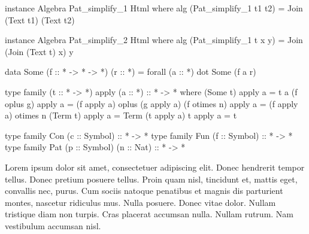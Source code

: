 \begin{code}
instance Algebra Pat_simplify_1 Html where
  alg (Pat_simplify_1 t1 t2) = Join (Text t1) (Text t2)

instance Algebra Pat_simplify_2 Html where
  alg (Pat_simplify_1 t x y) = Join (Join (Text t) x) y
\end{code}


\begin{code}
data Some (f :: * -> * -> *) (r :: *) = forall (a :: *) dot Some (f a r)
\end{code}

\begin{code}
type family (t :: * -> *) apply (a :: *) :: * -> *  where
  (Some t)      apply  a  = t a
  (f oplus g)   apply  a  = (f apply a) oplus (g apply a)
  (f otimes n)  apply  a  = (f apply a) otimes n
  (Term t)      apply  a  = Term (t apply a)
  t             apply  a  = t
\end{code}

\begin{code}
type family Con (c :: Symbol)             :: * -> *
type family Fun (f :: Symbol)             :: * -> *
type family Pat (p :: Symbol) (n :: Nat)  :: * -> *
\end{code}

Lorem ipsum dolor sit amet, consectetuer adipiscing elit. Donec hendrerit tempor
tellus. Donec pretium posuere tellus. Proin quam nisl, tincidunt et, mattis
eget, convallis nec, purus. Cum sociis natoque penatibus et magnis dis
parturient montes, nascetur ridiculus mus. Nulla posuere. Donec vitae dolor.
Nullam tristique diam non turpis. Cras placerat accumsan nulla. Nullam rutrum.
Nam vestibulum accumsan nisl\cite{godefroid2005dart}.

